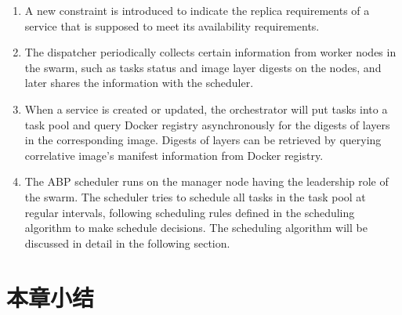 \begin{enumerate}
\item A new constraint is introduced to indicate the replica requirements of a service that is supposed to meet its availability requirements. 
\item The dispatcher periodically collects certain information from worker nodes in the swarm, such as tasks status and image layer digests on the nodes, and later shares the information with the scheduler.
\item When a service is created or updated, the orchestrator will put tasks into a task pool and query Docker registry asynchronously for the digests of layers in the corresponding image. Digests of layers can be retrieved by querying correlative image's manifest information from Docker registry. 
\item The ABP scheduler runs on the manager node having the leadership role of the swarm. The scheduler tries to schedule all tasks in the task pool at regular intervals, following scheduling rules defined in the scheduling algorithm to make schedule decisions. The scheduling algorithm will be discussed in detail in the following section.
\end{enumerate}



\section{本章小结}